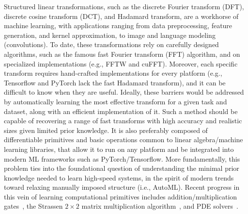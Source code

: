 Structured linear transformations, such as the discrete Fourier transform (DFT), discrete cosine transform (DCT), and Hadamard transform, are a workhorse of machine learning, with applications ranging from data preprocessing, feature generation, and kernel approximation, to image and language modeling (convolutions). To date, these transformations rely on carefully designed algorithms, such as the famous fast Fourier transform (FFT) algorithm, and on specialized implementations (e.g., FFTW and cuFFT). Moreover, each specific transform requires hand-crafted implementations for every platform (e.g., Tensorflow and PyTorch lack the fast Hadamard transform), and it can be difficult to know when they are useful. Ideally, these barriers would be addressed by automatically learning the most effective transform for a given task and dataset, along with an efficient implementation of it. Such a method should be capable of recovering a range of fast transforms with high accuracy and realistic sizes given limited prior knowledge. It is also preferably composed of differentiable primitives and basic operations common to linear algebra/machine learning libraries, that allow it to run on any platform and be integrated into modern ML frameworks such as PyTorch/Tensorflow. More fundamentally, this problem ties into the foundational question of understanding the minimal prior knowledge needed to learn high-speed systems, in the spirit of modern trends toward relaxing manually imposed structure (i.e., AutoML). Recent progress in this vein of learning computational primitives includes addition/multiplication gates~\citep{trask2018neural}, the Strassen $2\times2$ matrix multiplication algorithm~\citep{tschannen2018strassennet}, and PDE solvers~\citep{hsieh2019learning}.

